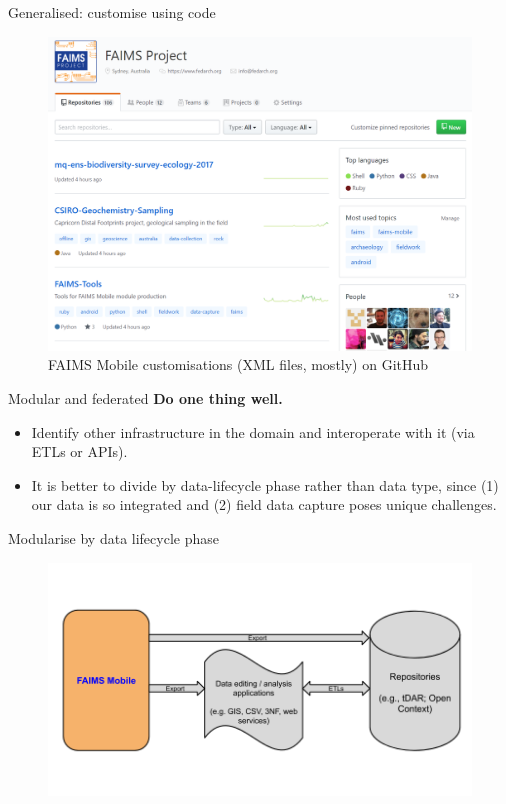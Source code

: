 \documentclass[
	aspectratio=169, %
	12pt, %
	t, %
]{beamer}
\begin{document}
\begin{refsegment}
\begin{frame}{Generalised: customise using code}
\begin{figure}[H]
        \includegraphics[height=.725\textheight]{figures/FAIMS-generalised.png}
        \caption{FAIMS Mobile customisations (XML files, mostly) on GitHub}
        \label{fig:figure11}
 \end{figure}
\end{frame}
\begin{frame}{Modular and federated}
  \textbf{Do one thing well.}
      \begin{itemize}
        \item Identify other infrastructure in the domain and interoperate with it (via ETLs or APIs).
        \item It is better to divide by data-lifecycle phase rather than data type, since (1) our data is so integrated and (2) field data capture poses unique challenges.
    \end{itemize}
\end{frame}
\begin{frame}{Modularise by data lifecycle phase}
 \begin{figure}[H]
    \centering
    \vspace{-0.5cm}
        \includegraphics[height=.75\textheight]{figures/FAIMS-federation.png}

\end{figure}
\end{frame}
\end{refsegment}
\end{document}
